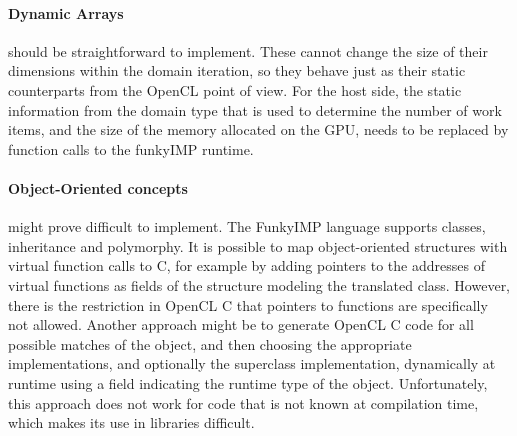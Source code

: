 \paragraph{Dynamic Arrays} should be straightforward to implement. These cannot change the size of their dimensions within the domain iteration, so they behave just as their static counterparts from the OpenCL point of view. For the host side, the static information from the domain type that is used to determine the number of work items, and the size of the memory allocated on the GPU, needs to be replaced by function calls to the funkyIMP runtime. \\

\paragraph{Object-Oriented concepts} might prove difficult to implement. The FunkyIMP language supports classes, inheritance and polymorphy. It is possible to map object-oriented structures with virtual function calls to C, for example by adding pointers to the addresses of virtual functions as fields of the structure modeling the translated class. However, there is the restriction in OpenCL C that pointers to functions are specifically not allowed. Another approach might be to generate OpenCL C code for all possible matches of the object, and then choosing the appropriate implementations, and optionally the superclass implementation, dynamically at runtime using a field indicating the runtime type of the object. Unfortunately, this approach does not work for code that is not known at compilation time, which makes its use in libraries difficult.\\